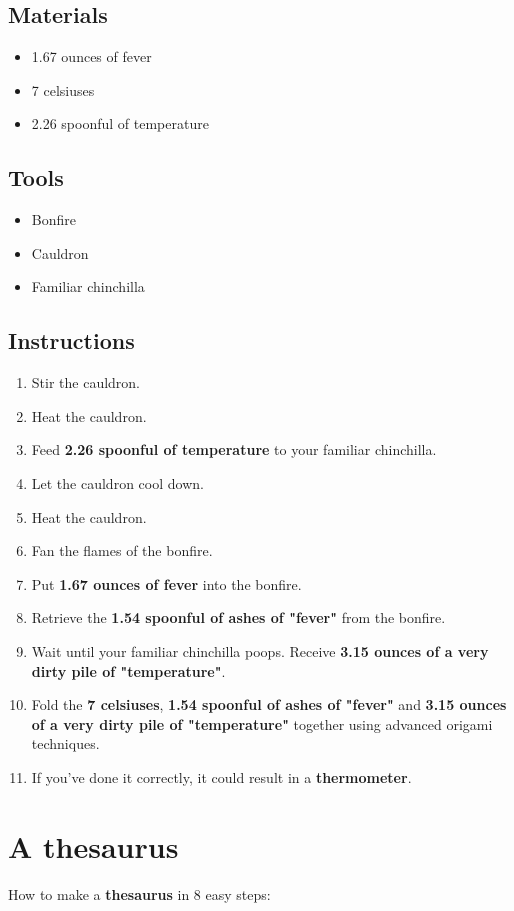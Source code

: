 \documentclass{article}
\begin{document}
\subsection{Materials}\begin{itemize}
\item 
1.67 ounces of fever
\item 
7 celsiuses
\item 
2.26 spoonful of temperature
\end{itemize}
\subsection{Tools}\begin{itemize}
\item 
Bonfire
\item 
Cauldron
\item 
Familiar chinchilla
\end{itemize}
\subsection{Instructions}\begin{enumerate}
\item 
Stir the cauldron.
\item 
Heat the cauldron.
\item 
Feed \textbf{2.26 spoonful of temperature} to your familiar chinchilla.
\item 
Let the cauldron cool down.
\item 
Heat the cauldron.
\item 
Fan the flames of the bonfire.
\item 
Put \textbf{1.67 ounces of fever} into the bonfire.
\item 
Retrieve the \textbf{1.54 spoonful of ashes of "fever"} from the bonfire.
\item 
Wait until your familiar chinchilla poops. Receive \textbf{3.15 ounces of a very dirty pile of "temperature"}.
\item 
Fold the \textbf{7 celsiuses}, \textbf{1.54 spoonful of ashes of "fever"} and \textbf{3.15 ounces of a very dirty pile of "temperature"} together using advanced origami techniques.
\item 
If you've done it correctly, it could result in a \textbf{thermometer}.
\end{enumerate}
\newpage
\section{A thesaurus}How to make a \textbf{thesaurus} in 8 easy steps:
\end{document}
